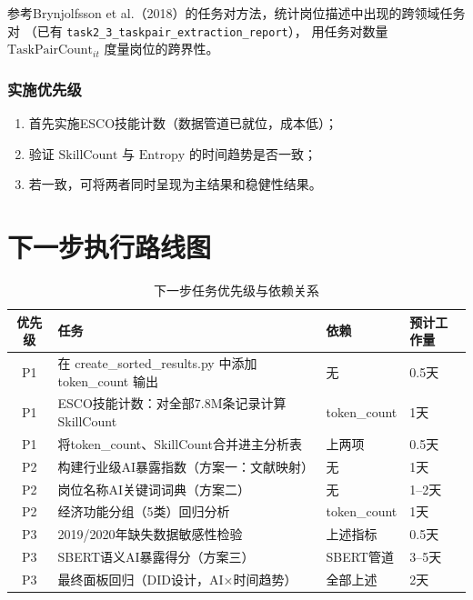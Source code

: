 \documentclass[12pt,a4paper]{ctexart}
\begin{document}
参考Brynjolfsson et al.（2018）的任务对方法，统计岗位描述中出现的跨领域任务对
（已有 \texttt{task2\_3\_taskpair\_extraction\_report}），
用任务对数量 $\text{TaskPairCount}_{it}$ 度量岗位的跨界性。

\subsubsection{实施优先级}

\begin{enumerate}
    \item 首先实施ESCO技能计数（数据管道已就位，成本低）；
    \item 验证 $\text{SkillCount}$ 与 $\text{Entropy}$ 的时间趋势是否一致；
    \item 若一致，可将两者同时呈现为主结果和稳健性结果。
\end{enumerate}

\section{下一步执行路线图}

\begin{table}[H]
\centering
\caption{下一步任务优先级与依赖关系}
\begin{tabular}{clll}
\toprule
优先级 & 任务 & 依赖 & 预计工作量 \\
\midrule
P1 & 在 create\_sorted\_results.py 中添加 token\_count 输出 & 无 & 0.5天 \\
P1 & ESCO技能计数：对全部7.8M条记录计算SkillCount & token\_count & 1天 \\
P1 & 将token\_count、SkillCount合并进主分析表 & 上两项 & 0.5天 \\
P2 & 构建行业级AI暴露指数（方案一：文献映射） & 无 & 1天 \\
P2 & 岗位名称AI关键词词典（方案二） & 无 & 1--2天 \\
P2 & 经济功能分组（5类）回归分析 & token\_count & 1天 \\
P3 & 2019/2020年缺失数据敏感性检验 & 上述指标 & 0.5天 \\
P3 & SBERT语义AI暴露得分（方案三） & SBERT管道 & 3--5天 \\
P3 & 最终面板回归（DID设计，AI×时间趋势） & 全部上述 & 2天 \\
\bottomrule
\end{tabular}
\end{table}
\end{document}
